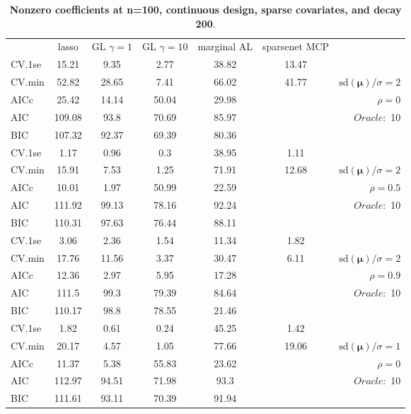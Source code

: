 \begin{table}\vspace{-.5cm}
\caption[l]{ { \bf Nonzero coefficients at n=100, continuous design, 
sparse covariates, and  decay  200}.}
\vspace{-.5cm}
\footnotesize{}
\begin{center}
\begin{tabular}{l*{5}{c}|r}
& lasso & GL $\gamma=1$ & GL $\gamma=10$ & marginal AL & sparsenet MCP  & \\
 \cline{1-7}
CV.1se & 15.21 & 9.35 & 2.77 & 38.82 & 13.47 & \\
CV.min & 52.82 & 28.65 & 7.41 & 66.02 & 41.77 &  $\mathrm{sd}(\mathbf{\mu})/\sigma=2$ \\
AICc & 25.42 & 14.14 & 50.04 & 29.98 & & $\rho=0$ \\
AIC & 109.08 & 93.8 & 70.69 & 85.97 & &  \multirow{2}{*}{$Oracle: $ 10} \\
BIC & 107.32 & 92.37 & 69.39 & 80.36 & &  \\
 \hline 
CV.1se & 1.17 & 0.96 & 0.3 & 38.95 & 1.11 & \\
CV.min & 15.91 & 7.53 & 1.25 & 71.91 & 12.68 &  $\mathrm{sd}(\mathbf{\mu})/\sigma=2$ \\
AICc & 10.01 & 1.97 & 50.99 & 22.59 & & $\rho=0.5$ \\
AIC & 111.92 & 99.13 & 78.16 & 92.24 & &  \multirow{2}{*}{$Oracle: $ 10} \\
BIC & 110.31 & 97.63 & 76.44 & 88.11 & &  \\
 \hline 
CV.1se & 3.06 & 2.36 & 1.54 & 11.34 & 1.82 & \\
CV.min & 17.76 & 11.56 & 3.37 & 30.47 & 6.11 &  $\mathrm{sd}(\mathbf{\mu})/\sigma=2$ \\
AICc & 12.36 & 2.97 & 5.95 & 17.28 & & $\rho=0.9$ \\
AIC & 111.5 & 99.3 & 79.39 & 84.64 & &  \multirow{2}{*}{$Oracle: $ 10} \\
BIC & 110.17 & 98.8 & 78.55 & 21.46 & &  \\
 \hline 
CV.1se & 1.82 & 0.61 & 0.24 & 45.25 & 1.42 & \\
CV.min & 20.17 & 4.57 & 1.05 & 77.66 & 19.06 &  $\mathrm{sd}(\mathbf{\mu})/\sigma=1$ \\
AICc & 11.37 & 5.38 & 55.83 & 23.62 & & $\rho=0$ \\
AIC & 112.97 & 94.51 & 71.98 & 93.3 & &  \multirow{2}{*}{$Oracle: $ 10} \\
BIC & 111.61 & 93.11 & 70.39 & 91.94 & &  \\

\end{tabular}
\end{center}
\end{table}
